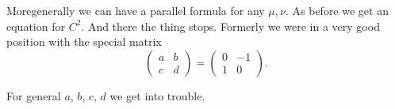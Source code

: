 More\pageoriginale generally we can have a parallel formula for any
$\mu, \nu$. As before we get an equation for $C^2$. And there the
thing stops. Formerly we were in a very good position with the special
matrix
$$
\begin{pmatrix}
a & b\\
c & d
\end{pmatrix}= 
\begin{pmatrix}
  0 & -1\\
  1 & 0
\end{pmatrix}.
$$

For general $a$, $b$, $c$, $d$ we get into trouble. 


